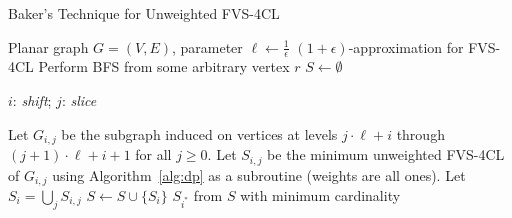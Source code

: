 \documentclass{beamer}
\begin{document}
\begin{frame}[fragile]{Baker's Technique for Unweighted FVS-4CL}
\small %
    \begin{algorithm}[H]
        \caption{Baker's technique for the unweighted FVS-4CL}
        \label{alg:unweighted_feedback_vertex_set_global}
        \begin{algorithmic}[1]
        \REQUIRE Planar graph $G = (V, E)$, parameter $\ell \leftarrow \frac{1}{\epsilon}$
        \ENSURE $(1 + \epsilon)$-approximation for \textsc{FVS-4CL}
        \STATE Perform \textsc{BFS} from some arbitrary vertex $r$ \label{alg3:line1}
        \STATE $S \leftarrow \emptyset$

        $i$: \textit{shift}; $j$: \textit{slice}

         \label{alg3:for-loop}
            \STATE Let $G_{i, j}$ be the subgraph induced on vertices at levels
            $j \cdot \ell + i$ through $(j+1) \cdot \ell + i + 1$ for all $j \geq 0$. \label{alg3:line4}
            \STATE Let $S_{i, j}$ be the minimum unweighted \textsc{FVS-4CL} of $G_{i, j}$ using Algorithm~\ref{alg:dp} as a subroutine (weights are all ones). \label{alg3:subroutine}
            \STATE Let $S_i = \bigcup_{j} S_{i, j}$ \label{alg3:line6}
            \STATE $S \leftarrow S \cup \{S_i\}$ \label{alg3:line7}
        \ENDFOR
        \RETURN $S_{i^*}$ from $S$ with minimum cardinality \label{alg3:line9}
        \end{algorithmic}
    \end{algorithm}
\end{frame}
\end{document}
